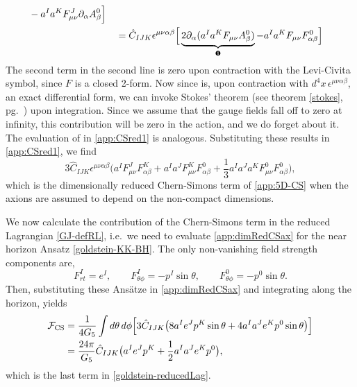 \documentclass[12pt,twoside]{book}
\begin{document}
\begin{appendices}
\begin{align*}
\begin{aligned}[t]
&- a^{I}a^{K}F^{J}_{\mu\nu}\partial_{\alpha}A^{0}_{\beta}
\Big]
\end{aligned} \\
&=
\hat{C}_{IJK}\epsilon^{\mu\nu\alpha\beta} \Big[
\underbrace{2\partial_{\alpha}(a^{I}a^{K}F_{\mu\nu}A^{0}_{\beta})}_\text{\ding{182}} - a^{I}a^{K}F_{\mu\nu}F^{0}_{\alpha\beta}
\Big] 
\end{align*} 
The second term in the second line is zero upon contraction with the Levi-Civita symbol, since $F$ is a closed 2-form. Now since  is, upon contraction with $d^{4}x\, \epsilon^{\mu\nu\alpha\beta}$, an exact differential form, we can invoke Stokes' theorem (see theorem \ref{stokes}, pg.\ \pageref{stokes}) upon integration. Since we assume that the gauge fields fall off to zero at infinity, this contribution will be zero in the action, and we do forget about it. The evaluation of  in \eqref{app:CSred1} is analogous. Substituting these results in \eqref{app:CSred1}, we find
\begin{equation}\label{app:dimRedCSax}
3\hat{C}_{IJK} \epsilon^{\mu\nu\alpha\beta}\Big(
a^{I} F^{J}_{\mu\nu} F^{K}_{\alpha\beta} + a^{I} a^{J} F^{K}_{\mu\nu} F^{0}_{\alpha\beta} +
\frac{1}{3} a^{I} a^{J} a^{K} F^{0}_{\mu\nu} F^{0}_{\alpha\beta}
\Big),
\end{equation}
which is the dimensionally reduced Chern-Simons term of \eqref{app:5D-CS} when the axions are assumed to depend on the non-compact dimensions.\newline

We now calculate the contribution of the Chern-Simons term in the reduced Lagrangian \eqref{GJ-defRL}, i.e.\ we need to evaluate \eqref{app:dimRedCSax} for the near horizon Ansatz \eqref{goldstein-KK-BH}. The only non-vanishing field strength components are,
\begin{equation}\label{app:AnsatzCS}
F^{I}_{rt} = e^{I},\qquad F^{I}_{\theta\phi} = - p^{I}\sin\theta, \qquad F^{0}_{\theta\phi} = -p^{0}\sin\theta.
\end{equation}
Then, substituting these Ans\"atze in \eqref{app:dimRedCSax} and integrating along the horizon, yields
\begin{align}
\mathcal{F}_{\mathrm{CS}} &= \frac{1}{4 G_{5}} \int d\theta \, d\phi \Big[
3\hat{C}_{IJK} \big(
8 a^{I}e^{J}p^{K}\sin\theta + 4 a^{I}a^{J}e^{K}p^{0}\sin\theta
\big) \Big] \notag \\
\label{eq:axions(x)}
&= \frac{24\pi}{G_{5}}\hat{C}_{IJK}\big(
a^{I}e^{J}p^{K} + \frac{1}{2}a^{I}a^{J}e^{K}p^{0}
\big),
\end{align}
which is the last term in \eqref{goldstein-reducedLag}.


\end{appendices}
\end{document}
